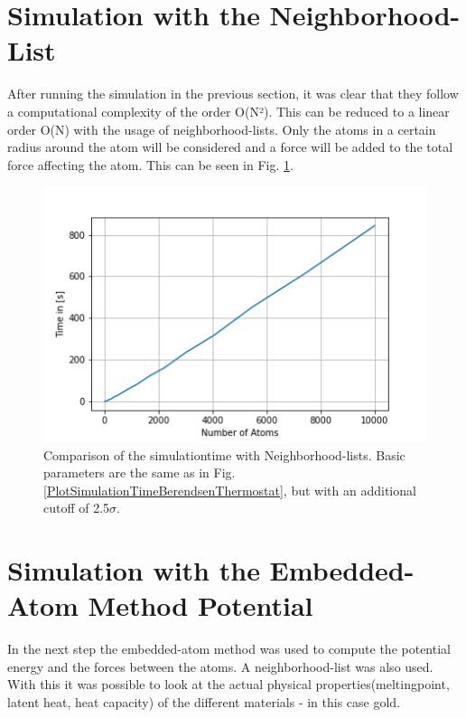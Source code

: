 \section{Simulation with the Neighborhood-List}

After running the simulation in the previous section, it was clear that they follow a computational complexity of the order O(N²). This can be reduced to a linear order O(N) with the usage of neighborhood-lists. Only the atoms in a certain radius around the atom will be considered and a force will be added to the total force affecting the atom. This can be seen in Fig. \ref{PlotSimulationTimesCutoffNew}.
\begin{figure}
	\begin{center}
		\includegraphics[scale=1.25]{Figure/plotAtomTimesM6.png}
	\end{center}
	\caption[Comparison of the simulationtime with neighborhood-lists ]{Comparison of the simulationtime with Neighborhood-lists. Basic parameters are the same as in Fig. \ref{PlotSimulationTimeBerendsenThermostat}, but with an additional cutoff of 2.5$\sigma$.}
	\label{PlotSimulationTimesCutoffNew}
\end{figure}

\section{Simulation with the Embedded-Atom Method Potential}

In the next step the embedded-atom method was used to compute the potential energy and the forces between the atoms. 
A neighborhood-list was also used. 
With this it was possible to look at the actual physical properties(meltingpoint, latent heat, heat capacity) of the different materials - in this case gold. 

